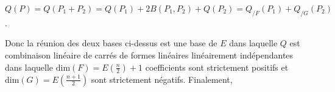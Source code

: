 {\begin{enumerate}
{\begin{center}
$Q(P)=Q(P_1+P_2) =Q(P_1)+2B(P_1,P_2)+Q(P_2) = Q_{/F}(P_1)+Q_{/G}(P_2)$.
\end{center}

Donc la réunion des deux bases ci-dessus est une base de $E$ dans laquelle $Q$ est combinaison linéaire de carrés de formes linéaires linéairement indépendantes dans laquelle $\text{dim}(F)=E\left(\frac{n}{2}\right)+1$ coefficients sont strictement positifs et 
$\text{dim}(G)=E\left(\frac{n+1}{2}\right)$ sont strictement négatifs. Finalement,

\begin{center}

\end{center}}
\end{enumerate}
}